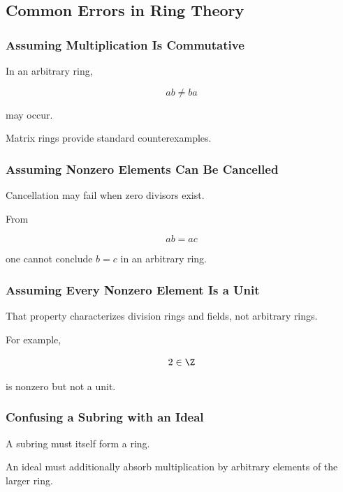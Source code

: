 \subsection{Common Errors in Ring Theory}
\label{subsec:common-ring-errors}

\subsubsection{Assuming Multiplication Is Commutative}

In an arbitrary ring,

\[ ab\neq ba \]

may occur.

Matrix rings provide standard counterexamples.

\subsubsection{Assuming Nonzero Elements Can Be Cancelled}

Cancellation may fail when zero divisors exist.

From

\[ ab=ac \]

one cannot conclude \(b=c\) in an arbitrary ring.

\subsubsection{Assuming Every Nonzero Element Is a Unit}

That property characterizes division rings and fields, not arbitrary rings.

For example,

\[ 2\in\Z \]

is nonzero but not a unit.

\subsubsection{Confusing a Subring with an Ideal}

A subring must itself form a ring.

An ideal must additionally absorb multiplication by arbitrary elements of the
larger ring.

